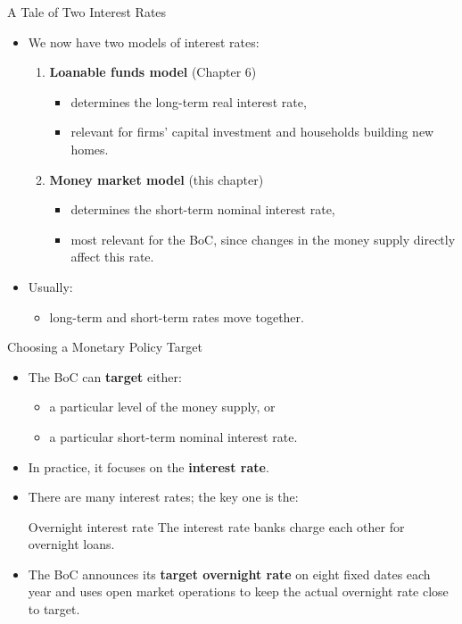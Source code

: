 \documentclass[aspectratio=169]{beamer}
\begin{document}
\begin{frame}{A Tale of Two Interest Rates}
\transfade
\begin{itemize}
  \item We now have two models of interest rates:
  \begin{enumerate}
    \item \textbf{Loanable funds model} (Chapter 6)
      \begin{itemize}
        \item determines the \alert{long-term real} interest rate,
        \item relevant for firms’ capital investment and households building new homes.
      \end{itemize}
    \item \textbf{Money market model} (this chapter)
      \begin{itemize}
        \item determines the \alert{short-term nominal} interest rate,
        \item most relevant for the BoC, since changes in the money supply directly affect this rate.
      \end{itemize}
  \end{enumerate}
  \item Usually:
  \begin{itemize}
    \item long-term and short-term rates move together.
  \end{itemize}
\end{itemize}
\end{frame}

\begin{frame}{Choosing a Monetary Policy Target}
\transfade
\begin{itemize}
  \item The BoC can \textbf{target} either:
  \begin{itemize}
    \item a particular level of the money supply, or
    \item a particular short-term nominal interest rate.
  \end{itemize}
  \item In practice, it focuses on the \textbf{interest rate}.
  \item There are many interest rates; the key one is the:
  \begin{block}{Overnight interest rate}
    The interest rate banks charge each other for overnight loans.
  \end{block}
  \item The BoC announces its \textbf{target overnight rate} on eight fixed dates each year and uses open market operations to keep the actual overnight rate close to target.
\end{itemize}
\end{frame}
\end{document}
